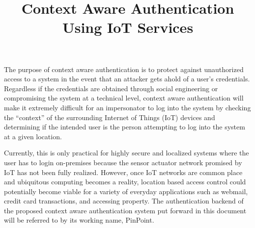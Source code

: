 \documentclass[11pt,journal]{IEEEtran}
\begin{document}
\title{Context Aware Authentication Using IoT Services}
\author{
}

\maketitle


The purpose of context aware authentication is to protect against unauthorized access to a system in the event that an attacker gets ahold of a user’s credentials.  Regardless if the credentials are obtained through social engineering or compromising the system at a technical level, context aware authentication will make it extremely difficult for an impersonator to log into the system by checking the “context” of the surrounding Internet of Things (IoT) devices and determining if the intended user is the person attempting to log into the system at a given location.  

Currently, this is only practical for highly secure and localized systems where the user has to login on-premises because the sensor actuator network promised by IoT has not been fully realized.  However, once IoT networks are common place and ubiquitous computing becomes a reality, location based access control could potentially become viable for a variety of everyday applications such as webmail, credit card transactions, and accessing property.  The authentication backend of the proposed context aware authentication system put forward in this document will be referred to by its working name, PinPoint.
\end{document}
